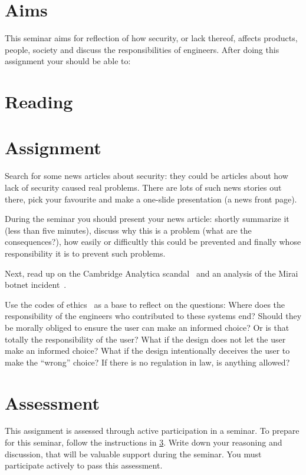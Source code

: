 \section{Aims}

This seminar aims for reflection of how security, or lack thereof, affects 
products, people, society and discuss the responsibilities of engineers.
After doing this assignment your should be able to:
\begin{itemize}
	
\end{itemize}


\section{Reading}%
\label{sec:Reading}




\section{Assignment}%
\label{sec:Tasks}

Search for some news articles about security: they could be articles about how 
lack of security caused real problems.
There are lots of such news stories out there, pick your favourite and make a 
one-slide presentation (\eg a news front page).

During the seminar you should present your news article: shortly summarize it 
(less than five minutes), discuss why this is a problem (\eg what are the 
consequences?), how easily or difficultly this could be prevented and finally 
whose responsibility it is to prevent such problems.

Next, read up on the Cambridge Analytica scandal~\cite[\eg][]{%
  wired-cambridge-analytica,
  guardian-cambridge-analytica,
  nytimes-cambridge-analytica,
  wp-cambridge-analytica,
} and an analysis of the Mirai botnet incident~\cite{schneier-mirai}.

Use the codes of ethics~\cite{acmcode,acmsecode,ieeecode} as a base to reflect 
on the questions: Where does the responsibility of the engineers who 
contributed to these systems end?
Should they be morally obliged to ensure the user can make an informed choice?
Or is that totally the responsibility of the user?
What if the design does not let the user make an informed choice?
What if the design intentionally deceives the user to make the \enquote{wrong} 
choice?
If there is no regulation in law, is anything allowed?


\section{Assessment}%
\label{Assessment}

This assignment is assessed through active participation in a seminar.
To prepare for this seminar, follow the instructions in \cref{sec:Tasks}.
Write down your reasoning and discussion, that will be valuable support during 
the seminar.
You must participate actively to pass this assessment.



\begin{frame}[allowframebreaks]
  \printbibliography{}
\end{frame}
